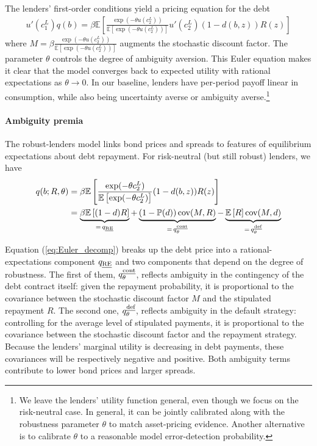 The lenders' first-order conditions yield a pricing equation for the debt
\begin{align*}
	u'(c_1^L) q(b) = \beta \mathbb{E}\left[ \frac{\exp(-\theta u(c_2^L))}{\mathbb{E}\left[\exp(-\theta u(c_2^L))\right]} u'(c_2^L) (1-d(b,z)) R(z) \right]
\end{align*}
where $M = \beta \frac{\exp(-\theta u(c_2^L))}{\mathbb{E}\left[\exp(-\theta u(c_2^L))\right]}$ augments the stochastic discount factor. The parameter $\theta$ controls the degree of ambiguity aversion. This Euler equation makes it clear that the model converges back to expected utility with rational expectations as $\theta \to 0$. In our baseline, lenders have per-period payoff linear in consumption, while also being uncertainty averse or ambiguity averse.\footnote{We leave the lenders' utility function general, even though we focus on the risk-neutral case. In general, it can be jointly calibrated along with the robustness parameter $\theta$ to match asset-pricing evidence. Another alternative is to calibrate $\theta$ to a reasonable model error-detection probability.}


\paragraph{Ambiguity premia} The robust-lenders model links bond prices and spreads to features of equilibrium expectations about debt repayment. For risk-neutral (but still robust) lenders, we have
\begin{align}\label{eq:Euler_decomp}
  q(b; R, \theta) &= \beta \mathbb{E}\left[ \frac{\exp(-\theta c_2^L)}{\mathbb{E}\left[\exp(-\theta c_2^L)\right]} (1-d(b,z)) R(z) \right] \notag \\
  &= \underbrace{\beta \mathbb{E}\left[(1-d)R\right]}_{=\, q_{\text{\emph{RE}}}} + \underbrace{\left(1-\mathbb{P}(d)\right)\text{cov}{(M,R)}}_{=\, q_\theta^\text{\emph{cont}}} - \underbrace{\mathbb{E}\left[R\right]\text{cov}{(M,d)}}_{=\, q_\theta^\text{\emph{def}}}
\end{align}

Equation (\ref{eq:Euler_decomp}) breaks up the debt price into a rational-expectations component $q_\text{\emph{RE}}$ and two components that depend on the degree of robustness. The first of them, $q_\theta^\text{\emph{cont}}$, reflects ambiguity in the contingency of the debt contract itself: given the repayment probability, it is proportional to the covariance between the stochastic discount factor $M$ and the stipulated repayment $R$. The second one, $q_\theta^\text{\emph{def}}$, reflects ambiguity in the default strategy: controlling for the average level of stipulated payments, it is proportional to the covariance between the stochastic discount factor and the repayment strategy. Because the lenders' marginal utility is decreasing in debt payments, these covariances will be respectively negative and positive. Both ambiguity terms contribute to lower bond prices and larger spreads.

